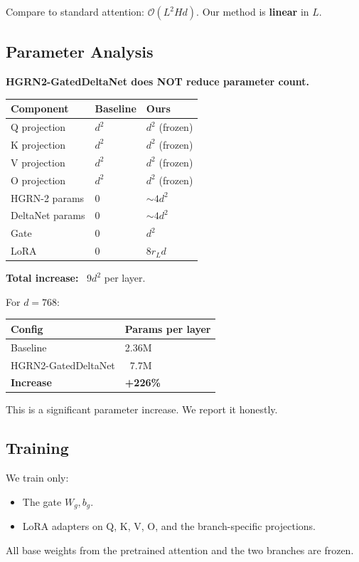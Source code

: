 Compare to standard attention: $\mathcal{O}(L^2 H d)$. Our method is 
\textbf{linear} in $L$.

\subsection{Parameter Analysis}

\textbf{HGRN2-GatedDeltaNet does NOT reduce parameter count.}

\begin{table}[H]
\centering
\small
\begin{tabular}{lll}
\toprule
\textbf{Component} & \textbf{Baseline} & \textbf{Ours} \\
\midrule
Q projection & $d^2$ & $d^2$ (frozen) \\
K projection & $d^2$ & $d^2$ (frozen) \\
V projection & $d^2$ & $d^2$ (frozen) \\
O projection & $d^2$ & $d^2$ (frozen) \\
HGRN-2 params & 0 & $\sim 4d^2$ \\
DeltaNet params & 0 & $\sim 4d^2$ \\
Gate & 0 & $d^2$ \\
LoRA & 0 & $8 r_L d$ \\
\bottomrule
\end{tabular}
\end{table}

\textbf{Total increase:} ~9$d^2$ per layer.

For $d = 768$:

\begin{table}[H]
\centering
\small
\begin{tabular}{ll}
\toprule
\textbf{Config} & \textbf{Params per layer} \\
\midrule
Baseline & 2.36M \\
HGRN2-GatedDeltaNet & ~7.7M \\
\textbf{Increase} & \textbf{+226\%} \\
\bottomrule
\end{tabular}
\end{table}

This is a significant parameter increase. We report it honestly.

\subsection{Training}

We train only:
\begin{itemize}
\item The gate $W_g, b_g$.
\item LoRA adapters on Q, K, V, O, and the branch-specific projections.

\end{itemize}
All base weights from the pretrained attention and the two branches are 
frozen.

